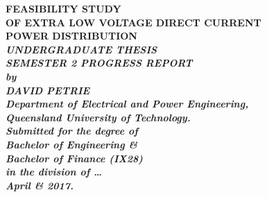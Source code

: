 \begin{titlepage}
\renewcommand{\baselinestretch}{1.0}
\begin{center}
\vspace*{35mm}
\Huge\bf
		FEASIBILITY STUDY\\
		OF EXTRA LOW VOLTAGE DIRECT CURRENT\\
		POWER DISTRIBUTION\\
\vspace{7mm}
\large\sl\bf
		UNDERGRADUATE THESIS\\
\vspace{7mm}
\large\sl\bf
		SEMESTER 2 PROGRESS REPORT\\
\vspace{15mm}
\large\sl
		by\\
		DAVID PETRIE
		\medskip\\
\rm
		Department of Electrical and Power Engineering,\\
		Queensland University of Technology.\\
\vspace{30mm}
		Submitted for the degree of\\
		Bachelor of Engineering \& \\
		Bachelor of Finance (IX28)
		\smallskip\\ [2cm]
\normalsize
		in the division of \ldots
		\medskip\\
\large
		April \& 2017.		
\end{center}
\end{titlepage}